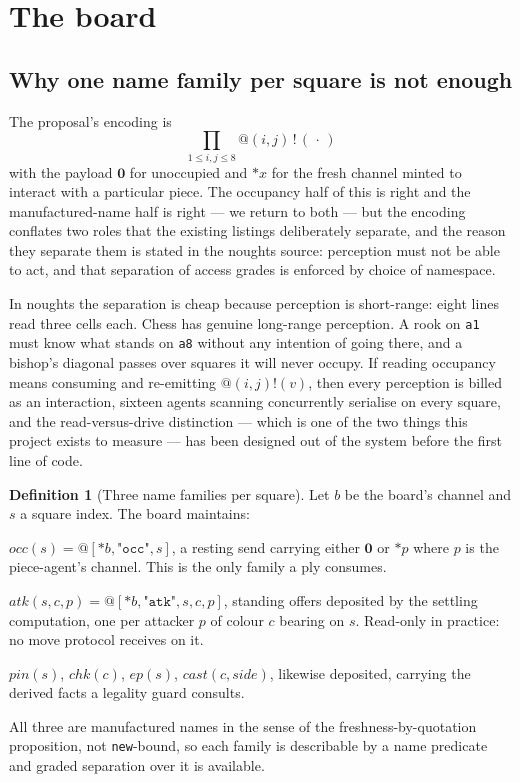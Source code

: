 \documentclass[11pt,a4paper]{article}
\makeatletter
\theoremstyle{plain}
\theoremstyle{definition}
\newtheorem{definition}[theorem]{Definition}
\theoremstyle{remark}
\newcommand{\Nil}{\mathbf{0}}
\newcommand{\qt}[1]{\ensuremath{@#1}}
\makeatother
\begin{document}
\section{The board}
\label{sec:board}

\subsection{Why one name family per square is not enough}

The proposal's encoding is
\[
  \prod_{1 \leq i,j \leq 8} \qt{(i,j)}\,!\,(\,\cdot\,)
\]
with the payload $\Nil$ for unoccupied and $*x$ for the fresh channel minted to
interact with a particular piece. The occupancy half of this is right and the
manufactured-name half is right --- we return to both --- but the encoding
conflates two roles that the existing listings deliberately separate, and the
reason they separate them is stated in the noughts source: perception must not be
able to act, and that separation of access grades is enforced by choice of
namespace.

In noughts the separation is cheap because perception is short-range: eight
lines read three cells each. Chess has genuine long-range perception. A rook on
\texttt{a1} must know what stands on \texttt{a8} without any intention of going
there, and a bishop's diagonal passes over squares it will never occupy. If
reading occupancy means consuming and re-emitting $\qt{(i,j)}!(v)$, then every
perception is billed as an interaction, sixteen agents scanning concurrently
serialise on every square, and the read-versus-drive distinction --- which is one
of the two things this project exists to measure --- has been designed out of the
system before the first line of code.

\begin{definition}[Three name families per square]
\label{def:families}
Let $b$ be the board's channel and $s$ a square index. The board maintains:
\begin{description}[leftmargin=2.2em,style=nextline]
\item[the occupancy cell] $\mathit{occ}(s) = \qt{[*b,\texttt{"occ"},s]}$, a
resting send carrying either $\Nil$ or $*p$ where $p$ is the piece-agent's
channel. This is the only family a ply consumes.
\item[the attack family] $\mathit{atk}(s,c,p) =
\qt{[*b,\texttt{"atk"},s,c,p]}$, standing offers deposited by the settling
computation, one per attacker $p$ of colour $c$ bearing on $s$. Read-only in
practice: no move protocol receives on it.
\item[the constraint family] $\mathit{pin}(s)$, $\mathit{chk}(c)$,
$\mathit{ep}(s)$, $\mathit{cast}(c,\mathit{side})$, likewise deposited, carrying
the derived facts a legality guard consults.
\end{description}
All three are manufactured names in the sense of the freshness-by-quotation
proposition, not \texttt{new}-bound, so each family is describable by a name
predicate and graded separation over it is available.
\end{definition}
\end{document}
